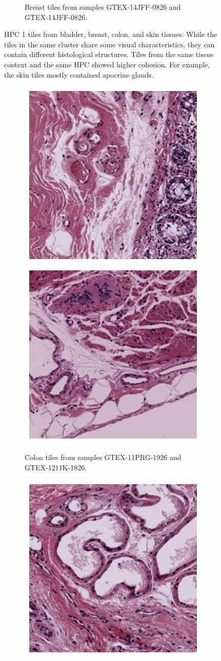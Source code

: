 \documentclass{l4proj}
\begin{document}
\begin{appendices}
\begin{figure}
\begin{subfigure}[b]{\textwidth}
        \caption{Breast tiles from samples GTEX-14JFF-0826 and GTEX-14JFF-0826.}
        \label{fig:leiden1_breast}
    \end{subfigure}
    \caption{HPC 1 tiles from  bladder,  breast,  colon, and  skin tissues. While the tiles in the same cluster share some visual characteristics, they can contain different histological structures. Tiles from the same tissue context and the same HPC showed higher cohesion. For example, the skin tiles mostly contained apocrine glands.}
    
\end{figure}
\begin{figure}\ContinuedFloat
    \begin{subfigure}[b]{\textwidth}
        \includegraphics[width=0.45\linewidth]{images/colon1_1s.png}
        \includegraphics[width=0.45\linewidth]{images/colon2_1s.png}
        \caption{Colon tiles from samples GTEX-11PRG-1926 and GTEX-1211K-1826.}
        \label{fig:leiden1_colon}
        \vspace{1in}
    \end{subfigure}
    \begin{subfigure}[b]{\textwidth}
        \includegraphics[width=0.45\linewidth]{images/skin1_1s.png}

\end{subfigure}
\end{figure}
\end{appendices}
\end{document}
